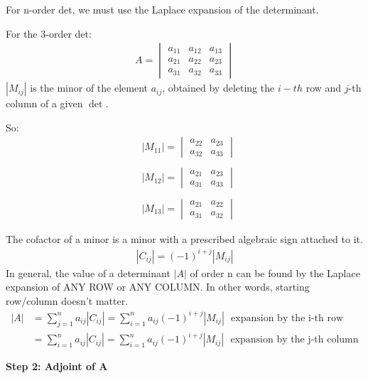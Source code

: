 \documentclass[10pt,a4paper]{book}
\theoremstyle{definition}\newtheorem{definition}{Definition}
\theoremstyle{definition}\newtheorem{fact}{Fact}
\theoremstyle{definition}\newtheorem{ex}{Ex.}
\theoremstyle{definition}\newtheorem{project}{Project}
\theoremstyle{definition}\newtheorem{problem}{Problem}
\theoremstyle{definition}\newtheorem{example}{Example}
\numberwithin{theorem}{chapter}
\numberwithin{corollary}{chapter}
\numberwithin{assumption}{chapter}
\numberwithin{definition}{chapter}
\numberwithin{prop}{chapter}
\numberwithin{notation}{chapter}
\numberwithin{problem}{chapter}
\numberwithin{example}{chapter}
\numberwithin{fact}{chapter}
\numberwithin{ex}{chapter}
\begin{document}
	
	For n-order det, we must use the Laplace expansion of the determinant.
	
	For the 3-order det:
	\begin{align}
		A = \begin{vmatrix}
			a_{11} & a_{12} & a_{13} \\
			a_{21} & a_{22} & a_{23} \\
			a_{31} & a_{32} & a_{33} 
		\end{vmatrix}
	\end{align}
	$ |M_{ij}| $ is the minor of the element $a_{ij}$, obtained by deleting the $i-th$ row and $j$-th column of a given $\det$.
	
	So:
	\begin{align*}
		& |M_{11}| = 
		\begin{vmatrix}
			a_{22} & a_{23}     \\
			a_{32} & a_{33}     
		\end{vmatrix} \\
		&            \\
		& |M_{12}| = 
		\begin{vmatrix}
			a_{21} & a_{23}     \\
			a_{31} & a_{33}     
		\end{vmatrix} \\
		&            \\
		& |M_{13}| = 
		\begin{vmatrix}
			a_{21} & a_{22}     \\
			a_{31} & a_{32}     
		\end{vmatrix}
	\end{align*}
	
	The cofactor of a minor is a minor with a prescribed algebraic sign attached to it.
	\begin{align}
		|C_{ij}| = (-1)^{i+j} |M_{ij}| 
	\end{align}
	In general, the value of a determinant $|A|$ of order n can be found by the Laplace expansion of ANY ROW or ANY COLUMN. In other words, starting row/column doesn't matter.
	\begin{align*}
		|A| & = \sum_{j=1}^{n} a_{ij} |C_{ij}| = \sum_{i=1}^{n} a_{ij} (-1)^{i+j}|M_{ij}| \ \ \ \text{expansion by the i-th row}    \\
		& = \sum_{i=1}^{n} a_{ij} |C_{ij}| = \sum_{i=1}^{n} a_{ij} (-1)^{i+j}|M_{ij}| \ \ \ \text{expansion by the j-th column} 
	\end{align*}
	
	\textbf{Step 2: Adjoint of A}
	
\end{document}
